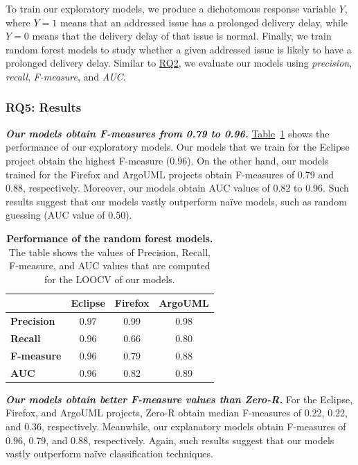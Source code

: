 To train our exploratory models, we produce a dichotomous response variable $Y$,
where $Y=1$ means that an addressed issue has a prolonged delivery delay, while $Y=0$
means that the delivery delay of that issue is normal. Finally, we train
random forest models to study whether a given addressed issue is likely to have a
prolonged delivery delay. Similar to \hyperref[ch4:rq2]{RQ2}, we evaluate our models
using \textit{precision}, \textit{recall}, \textit{F-measure}, and \textit{AUC}.

\subsubsection*{RQ5: Results}

\noindent\textit{\textbf{Our models obtain F-measures from 0.79 to 0.96.}}
\hyperref[ch4:tbl:RFclassificationResult_ab]{Table}~\ref{ch4:tbl:RFclassificationResult_ab}
shows the performance of our exploratory models. Our models that we train for
the Eclipse project obtain the highest F-measure (0.96). On the other hand, our
models trained for the Firefox and ArgoUML projects obtain F-measures of 0.79
and 0.88, respectively. Moreover, our models obtain AUC values of 0.82 to 0.96.
Such results suggest that our models vastly outperform na\"{i}ve models, such as
random guessing (AUC value of 0.50).  \\

\begin{table}[t!]
	\footnotesize
	\centering
	\caption{\textbf{Performance of the random forest models.} The table
		shows the values of Precision, Recall, F-measure, and AUC values that
	are computed for the LOOCV of our models.}
	\label{ch4:tbl:RFclassificationResult_ab}
	\begin{tabular}{lccc}
		\cline{2-4} 
		& \textbf{Eclipse} & \textbf{Firefox} & \textbf{ArgoUML}\tabularnewline
		\hline 
		\textbf{Precision} & 0.97 & 0.99 & 0.98\tabularnewline
		\hline 
		\textbf{Recall} & 0.96 & 0.66 & 0.80\tabularnewline
		\hline 
		\textbf{F-measure} & 0.96 & 0.79 & 0.88\tabularnewline
		\hline 
		\textbf{AUC} & 0.96 & 0.82 & 0.89\tabularnewline
		\hline 
	\end{tabular}
\end{table}

\noindent\textit{\textbf{Our models obtain better F-measure values than
Zero-R.}} For the Eclipse, Firefox, and ArgoUML projects, Zero-R obtain median F-measures
of 0.22, 0.22, and 0.36, respectively. Meanwhile, our explanatory models obtain
F-measures of 0.96, 0.79, and 0.88, respectively. Again, such results suggest
that our models vastly outperform na\"{i}ve classification techniques.  \\

